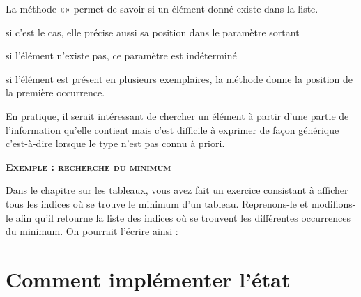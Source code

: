 \begin{liste}
	\item 
		La méthode «» permet de savoir si un élément
		donné existe dans la liste. 
		\begin{liste}
			\item 
				si c’est le cas, elle précise aussi sa position dans le paramètre sortant 
			\item 
				si l’élément n’existe pas, ce paramètre est	indéterminé 
			\item 
				si l’élément est présent en plusieurs exemplaires, la méthode donne la
				position de la première occurrence.
		\end{liste}
	\item 
		En pratique, il serait intéressant de chercher un élément à partir d’une
		partie de l’information qu’elle contient mais c’est difficile à
		exprimer de façon générique c'est-à-dire lorsque le
		type n'est pas connu à priori.
\end{liste}

\bigskip

{\sffamily\bfseries\scshape
Exemple : recherche du minimum}

Dans le chapitre sur les tableaux, vous avez fait un exercice consistant
à afficher tous les indices où se trouve le minimum d’un tableau.
Reprenons-le et modifions-le afin qu’il retourne la liste des indices
où se trouvent les différentes occurrences du minimum. On pourrait
l’écrire ainsi :


\bigskip

\section{Comment implémenter l’état}

